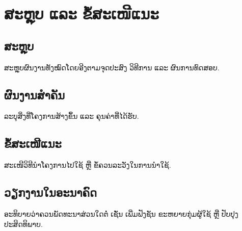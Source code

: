 \chapter{ສະຫຼຸບ ແລະ ຂໍ້ສະເໜີແນະ}

\section{ສະຫຼຸບ}
ສະຫຼຸບຜົນງານທັງໝົດໂດຍອີງຕາມຈຸດປະສົງ ວິທີການ ແລະ ຜົນການທົດສອບ.

\section{ຜົນງານສຳຄັນ}
ລະບຸສິ່ງທີ່ໂຄງການສ້າງຂຶ້ນ ແລະ ຄຸນຄ່າທີ່ໄດ້ຮັບ.

\section{ຂໍ້ສະເໜີແນະ}
ສະເໜີວິທີນຳໂຄງການໄປໃຊ້ ຫຼື ຂໍ້ຄວນລະວັງໃນການນຳໃຊ້.

\section{ວຽກງານໃນອະນາຄົດ}
ອະທິບາຍວ່າຄວນພັດທະນາສ່ວນໃດຕໍ່ ເຊັ່ນ ເພີ່ມຟັງຊັນ ຂະຫຍາຍກຸ່ມຜູ້ໃຊ້ ຫຼື ປັບປຸງປະສິດທິພາບ.
